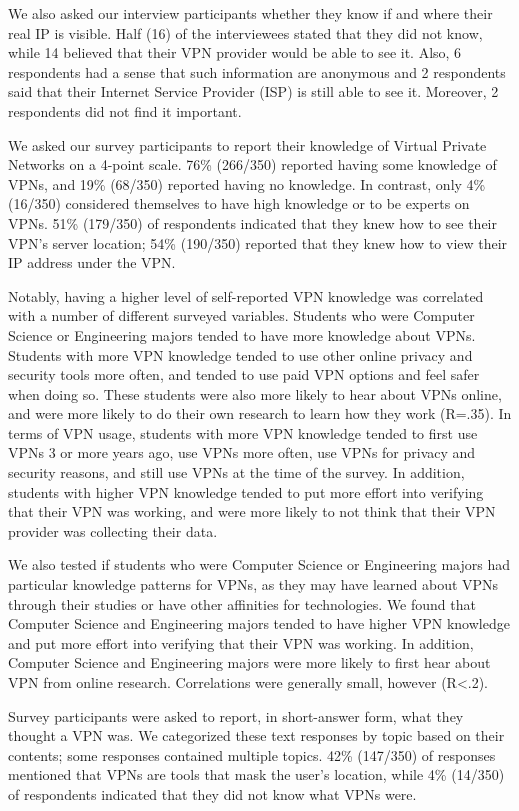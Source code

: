 We also asked our interview participants whether they know if and where their
real IP is visible. Half (16) of the interviewees stated that they did not
know, while 14 believed that their VPN provider would be able to see it. Also,
6 respondents had a sense that such information are anonymous and 2
respondents said that their Internet Service Provider (ISP) is still able to
see it. Moreover, 2 respondents did not find it important.

We asked our survey participants to report their knowledge of Virtual Private
Networks on a 4-point scale. 76\% (266/350) reported having some knowledge of
VPNs, and 19\% (68/350) reported having no knowledge. In contrast, only 4\%
(16/350) considered themselves to have high knowledge or to be experts on
VPNs. 51\% (179/350) of respondents indicated that they knew how to see their
VPN’s server location; 54\% (190/350) reported that they knew how to view
their IP address under the VPN.

Notably, having a higher level of self-reported VPN knowledge was correlated
with a number of different surveyed variables. Students who were Computer
Science or Engineering majors tended to have more knowledge about VPNs.
Students with more VPN knowledge tended to use other online privacy and
security tools more often, and tended to use paid VPN options and feel safer
when doing so. These students were also more likely to hear about VPNs online,
and were more likely to do their own research to learn how they work (R=.35).
In terms of VPN usage, students with more VPN knowledge tended to first use
VPNs 3 or more years ago, use VPNs more often, use VPNs for privacy and
security reasons, and still use VPNs at the time of the survey. In addition,
students with higher VPN knowledge tended to put more effort into verifying
that their VPN was working, and were more likely to not think that their VPN
provider was collecting their data.

We also tested if students who were Computer Science or Engineering majors had
particular knowledge patterns for VPNs, as they may have learned about VPNs
through their studies or have other affinities for technologies. We found that
Computer Science and Engineering majors tended to have higher VPN knowledge
and put more effort into verifying that their VPN was working. In addition,
Computer Science and Engineering majors were more likely to first hear about
VPN from online research. Correlations were generally small, however (R<.2).

Survey participants were asked to report, in short-answer form, what they
thought a VPN was. We categorized these text responses by topic based on their
contents; some responses contained multiple topics. 42\% (147/350) of
responses mentioned that VPNs are tools that mask the user’s location, while
4\% (14/350) of respondents indicated that they did not know what VPNs were.

